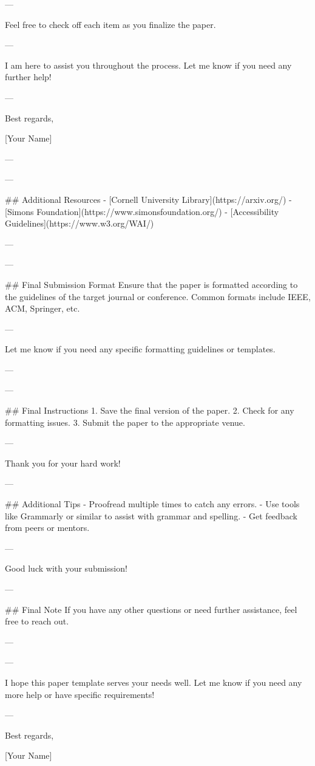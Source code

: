 --- 

Feel free to check off each item as you finalize the paper. 

--- 

I am here to assist you throughout the process. Let me know if you need any further help! 

--- 

Best regards, 

[Your Name]

--- 

---

## Additional Resources
- [Cornell University Library](https://arxiv.org/)
- [Simons Foundation](https://www.simonsfoundation.org/)
- [Accessibility Guidelines](https://www.w3.org/WAI/)

--- 

---

## Final Submission Format
Ensure that the paper is formatted according to the guidelines of the target journal or conference. Common formats include IEEE, ACM, Springer, etc.

--- 

Let me know if you need any specific formatting guidelines or templates. 

--- 

---

## Final Instructions
1. Save the final version of the paper.
2. Check for any formatting issues.
3. Submit the paper to the appropriate venue.

--- 

Thank you for your hard work! 

--- 

## Additional Tips
- Proofread multiple times to catch any errors.
- Use tools like Grammarly or similar to assist with grammar and spelling.
- Get feedback from peers or mentors.

--- 

Good luck with your submission! 

--- 

## Final Note
If you have any other questions or need further assistance, feel free to reach out. 

--- 

---

I hope this paper template serves your needs well. Let me know if you need any more help or have specific requirements! 

--- 

Best regards, 

[Your Name] 

